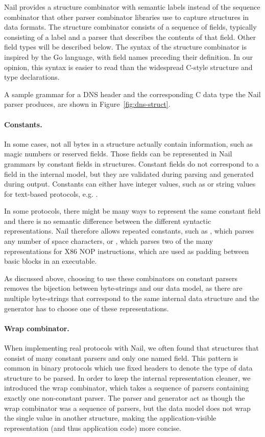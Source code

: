 Nail provides a structure combinator with semantic labels instead of the sequence combinator that
other parser combinator libraries use to capture structures in data formats. 
The structure combinator consists of a sequence of fields, typically consisting of a label and a
parser that describes the contents of that field. Other field types will be described below.
 The syntax of the structure combinator is inspired by the Go language\cite{golang}, with field names preceding their definition.
In our opinion, this syntax is easier to read than the widespread C-style structure and type
declarations.

A sample grammar for a DNS header and the corresponding C data type the Nail parser produces, are
shown in Figure~\ref{fig:dns-struct}.

\paragraph{Constants.}
In some cases, not all bytes in a structure actually contain information, such as magic numbers or
reserved fields. Those fields can be represented in Nail grammars by constant fields in structures.
Constant fields do not correspond to a field in the internal model, but they are validated during
parsing and generated during output.  Constants can either have integer values, such as
 or string values for text-based protocols, e.g. .

In some protocols, there might be many ways to represent the same constant field
and there is no semantic difference between the different syntactic representations.
Nail therefore allows repeated constants, such as , which parses any number of space characters, or
, which parses two of the many representations for X86
NOP instructions, which are used as padding between basic blocks in an executable. 

As discussed above, choosing to use these combinators on constant parsers
removes the bijection between byte-strings and our data model, as there are
multiple byte-strings that correspond to the same internal data structure and
the generator has to choose one of these representations.
\paragraph{Wrap combinator.} 
When implementing real protocols with Nail, we often found that
structures that consist of many constant parsers and only one named field. This pattern is
common in binary protocols which use fixed headers to denote the type of data
structure to be parsed.  In order to keep the internal representation cleaner,
we introduced the wrap combinator, which takes a sequence of parsers containing
exactly one non-constant parser. The parser and generator act as though the wrap
combinator was a sequence of parsers, but the data model does not wrap the
single value in another structure, making the application-visible representation
(and thus application code) more concise.


